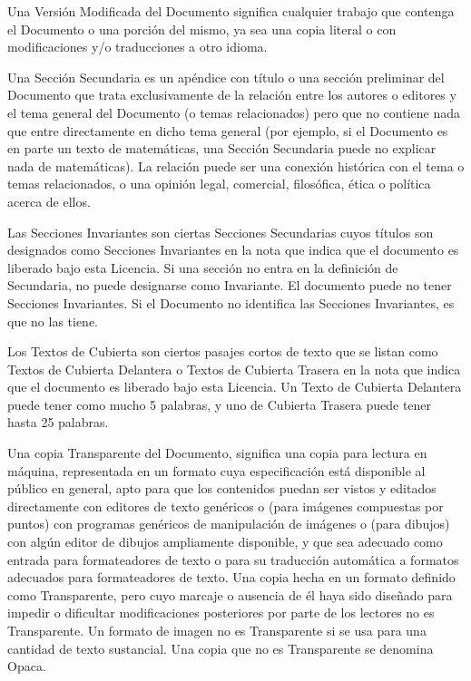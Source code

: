 \documentclass[a4paper, 11pt, oneside]{report}
\begin{document}
Una Versión Modificada del Documento significa cualquier trabajo que contenga el Documento o una porción del mismo, ya sea una copia literal o con modificaciones y/o traducciones a otro idioma.

Una Sección Secundaria es un apéndice con título o una sección preliminar del Documento que trata exclusivamente de la relación entre los autores o editores y el tema general del Documento (o temas relacionados) pero que no contiene nada que entre directamente en dicho tema general (por ejemplo, si el Documento es en parte un texto de matemáticas, una Sección Secundaria puede no explicar nada de matemáticas). La relación puede ser una conexión histórica con el tema o temas relacionados, o una opinión legal, comercial, filosófica, ética o política acerca de ellos.

Las Secciones Invariantes son ciertas Secciones Secundarias cuyos títulos son designados como Secciones Invariantes en la nota que indica que el documento es liberado bajo esta Licencia. Si una sección no entra en la definición de Secundaria, no puede designarse como Invariante. El documento puede no tener Secciones Invariantes. Si el Documento no identifica las Secciones Invariantes, es que no las tiene.

Los Textos de Cubierta son ciertos pasajes cortos de texto que se listan como Textos de Cubierta Delantera o Textos de Cubierta Trasera en la nota que indica que el documento es liberado bajo esta Licencia. Un Texto de Cubierta Delantera puede tener como mucho 5 palabras, y uno de Cubierta Trasera puede tener hasta 25 palabras.

Una copia Transparente del Documento, significa una copia para lectura en máquina, representada en un formato cuya especificación está disponible al público en general, apto para que los contenidos puedan ser vistos y editados directamente con editores de texto genéricos o (para imágenes compuestas por puntos) con programas genéricos de manipulación de imágenes o (para dibujos) con algún editor de dibujos ampliamente disponible, y que sea adecuado como entrada para formateadores de texto o para su traducción automática a formatos adecuados para formateadores de texto. Una copia hecha en un formato definido como Transparente, pero cuyo marcaje o ausencia de él haya sido diseñado para impedir o dificultar modificaciones posteriores por parte de los lectores no es Transparente. Un formato de imagen no es Transparente si se usa para una cantidad de texto sustancial. Una copia que no es Transparente se denomina Opaca.
\end{document}
